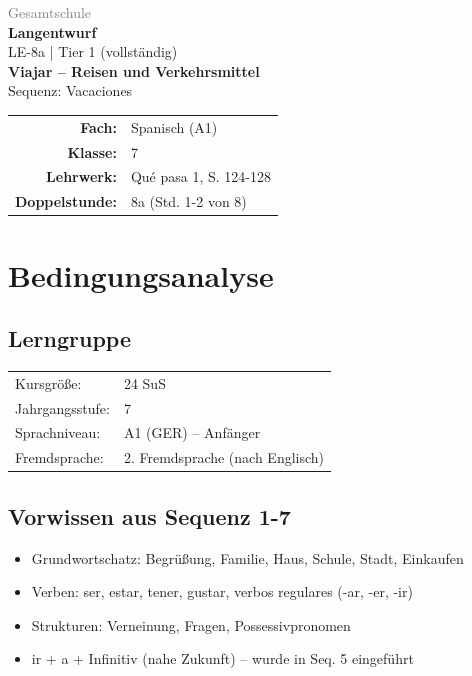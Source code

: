 \documentclass[11pt,a4paper]{article}
\newcommand{\fach}{Spanisch}
\newcommand{\jahrgangsstufe}{7}
\newcommand{\schulart}{Gesamtschule}
\newcommand{\stundenthema}{Viajar -- Reisen und Verkehrsmittel}
\newcommand{\reihenthema}{Vacaciones}
\newcommand{\stundennummer}{8a}
\newcommand{\gerniveau}{A1}
\newcommand{\lehrwerk}{Qué pasa 1}
\newcommand{\lehrwerkseite}{S. 124-128}
\newcommand{\lerngruppengroesse}{24}
\begin{document}
\begin{titlepage}
    \centering
    \vspace*{2cm}
    {\large\textcolor{gray}{\schulart}}\\[2cm]
    {\Huge\textcolor{fach}{\textbf{Langentwurf}}}\\[0.5cm]
    {\large LE-\stundennummer{} | Tier 1 (vollständig)}\\[2cm]
    {\LARGE\textbf{\stundenthema}}\\[0.5cm]
    {\large Sequenz: \reihenthema}\\[2cm]
    \begin{tabular}{rl}
        \textbf{Fach:} & \fach{} (\gerniveau) \\[0.3cm]
        \textbf{Klasse:} & \jahrgangsstufe \\[0.3cm]
        \textbf{Lehrwerk:} & \lehrwerk, \lehrwerkseite \\[0.3cm]
        \textbf{Doppelstunde:} & \stundennummer{} (Std. 1-2 von 8) \\[0.3cm]
    \end{tabular}
    \vfill
\end{titlepage}

\tableofcontents
\newpage

\section{Bedingungsanalyse}

\subsection{Lerngruppe}
\begin{tabular}{ll}
    Kursgröße: & \lerngruppengroesse{} SuS \\
    Jahrgangsstufe: & \jahrgangsstufe \\
    Sprachniveau: & \gerniveau{} (GER) -- Anfänger \\
    Fremdsprache: & 2. Fremdsprache (nach Englisch) \\
\end{tabular}

\subsection{Vorwissen aus Sequenz 1-7}
\begin{itemize}
    \item Grundwortschatz: Begrüßung, Familie, Haus, Schule, Stadt, Einkaufen
    \item Verben: ser, estar, tener, gustar, verbos regulares (-ar, -er, -ir)
    \item Strukturen: Verneinung, Fragen, Possessivpronomen
    \item ir + a + Infinitiv (nahe Zukunft) -- wurde in Seq. 5 eingeführt
\end{itemize}
\end{document}
